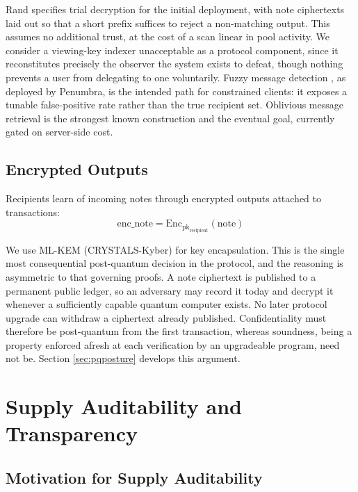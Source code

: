 \documentclass[11pt,a4paper]{article}
\begin{document}
Rand specifies trial decryption for the initial deployment, with note ciphertexts laid out so that a short prefix suffices to reject a non-matching output. This assumes no additional trust, at the cost of a scan linear in pool activity. We consider a viewing-key indexer unacceptable as a protocol component, since it reconstitutes precisely the observer the system exists to defeat, though nothing prevents a user from delegating to one voluntarily. Fuzzy message detection \cite{Beck2021}, as deployed by Penumbra, is the intended path for constrained clients: it exposes a tunable false-positive rate rather than the true recipient set. Oblivious message retrieval \cite{Liu2022} is the strongest known construction and the eventual goal, currently gated on server-side cost.\subsection{Encrypted Outputs}

Recipients learn of incoming notes through encrypted outputs attached to transactions:
\begin{equation}
\text{enc\_note} = \text{Enc}_{\text{pk}_{\text{recipient}}}(\text{note})
\end{equation}

We use ML-KEM (CRYSTALS-Kyber) \cite{Bos2018} for key encapsulation. This is the single most consequential post-quantum decision in the protocol, and the reasoning is asymmetric to that governing proofs. A note ciphertext is published to a permanent public ledger, so an adversary may record it today and decrypt it whenever a sufficiently capable quantum computer exists. No later protocol upgrade can withdraw a ciphertext already published. Confidentiality must therefore be post-quantum from the first transaction, whereas soundness, being a property enforced afresh at each verification by an upgradeable program, need not be. Section \ref{sec:pqposture} develops this argument.

\section{Supply Auditability and Transparency}
\label{sec:supply}

\subsection{Motivation for Supply Auditability}
\end{document}
